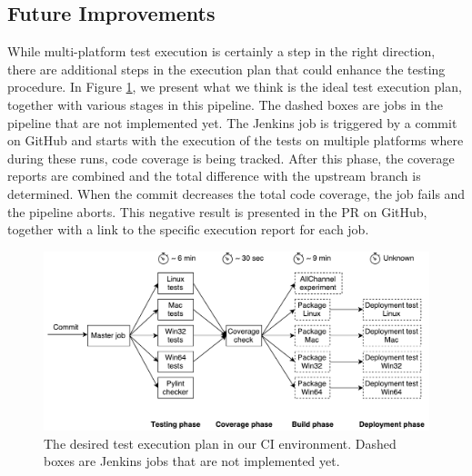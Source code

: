 \subsection{Future Improvements}
While multi-platform test execution is certainly a step in the right direction, there are additional steps in the execution plan that could enhance the testing procedure. In Figure \ref{fig:jenkins-pipeline}, we present what we think is the ideal test execution plan, together with various stages in this pipeline. The dashed boxes are jobs in the pipeline that are not implemented yet. The Jenkins job is triggered by a commit on GitHub and starts with the execution of the tests on multiple platforms where during these runs, code coverage is being tracked. After this phase, the coverage reports are combined and the total difference with the upstream branch is determined. When the commit decreases the total code coverage, the job fails and the pipeline aborts. This negative result is presented in the PR on GitHub, together with a link to the specific execution report for each job.\\

\begin{figure}[h!]
	\centering
	\includegraphics[width=1.0\columnwidth]{images/improving_qa/jenkins_pipeline}
	\caption{The desired test execution plan in our CI environment. Dashed boxes are Jenkins jobs that are not implemented yet.}
	\label{fig:jenkins-pipeline}
\end{figure}

